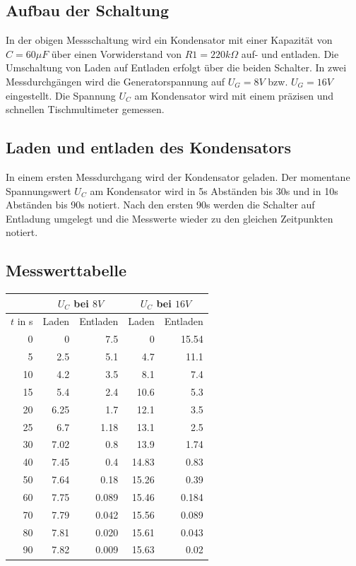\documentclass[
a4paper,     %
 headsepline, %
11pt         %
]{scrartcl}  %
\begin{document}
\subsection{Aufbau der Schaltung}
In der obigen Messschaltung wird ein Kondensator mit einer Kapazität von $C=60\mu F$ über einen Vorwiderstand von $R1=220k\Omega$ auf- und entladen. Die Umschaltung von Laden auf Entladen erfolgt über die beiden Schalter. In zwei Messdurchgängen wird die Generatorspannung auf $U_G=8V$ bzw. $U_G=16V$ eingestellt. Die Spannung $U_C$ am Kondensator wird mit einem präzisen und schnellen Tischmultimeter gemessen.

\subsection{Laden und entladen des Kondensators}

In einem ersten Messdurchgang wird der Kondensator geladen. Der momentane Spannungswert $U_C$ am Kondensator wird in 5s Abständen bis 30s und in 10s Abständen bis 90s notiert. Nach den ersten 90s werden die Schalter auf Entladung umgelegt und die Messwerte wieder zu den gleichen Zeitpunkten notiert. 

\subsection{Messwerttabelle}
\begin{center}
\begin{tabular}{ r | r | r | r | r }
	\multicolumn{1}{r}{} &  \multicolumn{2}{|c}{$U_C$ bei $8V$} & \multicolumn{2}{|c}{$U_C$ bei $16V$} \\ \hline
    $t$ in s    & Laden & Entladen & Laden & Entladen \\ \hline
    0           & 0     & 7.5      & 0     & 15.54 \\
    5           & 2.5   & 5.1      & 4.7   & 11.1 \\
    10          & 4.2   & 3.5      & 8.1   & 7.4 \\
    15          & 5.4   & 2.4      & 10.6  & 5.3 \\
    20          & 6.25  & 1.7      & 12.1  & 3.5 \\
    25          & 6.7   & 1.18     & 13.1  & 2.5 \\
    30          & 7.02  & 0.8      & 13.9  & 1.74 \\
    40          & 7.45  & 0.4      & 14.83 & 0.83 \\
    50          & 7.64  & 0.18     & 15.26 & 0.39 \\
    60          & 7.75  & 0.089    & 15.46 & 0.184 \\
    70          & 7.79  & 0.042    & 15.56 & 0.089 \\
    80          & 7.81  & 0.020    & 15.61 & 0.043 \\
    90          & 7.82  & 0.009    & 15.63 & 0.02 \\
    \hline
\end{tabular} \\
\end{center}
\end{document}
